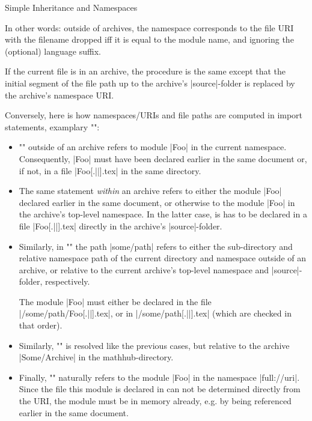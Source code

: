 \begin{sfragment}{Simple Inheritance and Namespaces}
\begin{dangerbox}
   In other words: outside of archives, the namespace corresponds to
   the file URI with the filename dropped iff it is equal to the
   module name, and ignoring the (optional) language suffix.

   If the current file is in an archive, the procedure is the same
   except that the initial segment of the file path up to the archive's
   |source|-folder is replaced by the archive's namespace URI.
\end{dangerbox}

\begin{dangerbox}
        Conversely, here is how namespaces/URIs and file paths are computed
 in import statements, examplary \stexcode"\importmodule":

 \begin{itemize}
   \item \stexcode"" outside of an archive refers 
     to module |Foo| in the current namespace. Consequently, |Foo|
     must have been declared earlier in the same document or, if not,
     in a file |Foo[.||].tex| in the same directory.
   \item The same statement \emph{within} an archive refers to either
     the module |Foo| declared earlier in the same document, or
     otherwise to the module |Foo| in the archive's top-level namespace.
     In the latter case, is has to be declared in a file |Foo[.||].tex|
     directly in the archive's |source|-folder.
   \item Similarly, in \stexcode"" the path
     |some/path| refers to either the sub-directory and relative 
     namespace path of the current directory and namespace outside of an archive,
     or relative to the current archive's top-level namespace and |source|-folder,
     respectively.

     The module |Foo| must either be declared in the file
     |/some/path/Foo[.||].tex|, or in
     |/some/path[.||].tex| (which are
     checked in that order).
   \item Similarly, \stexcode""
     is resolved like the previous cases, but relative to the archive
     |Some/Archive| in the mathhub-directory.
   \item Finally, \stexcode"" naturally refers to the
     module |Foo| in the namespace |full://uri|. Since the file this module
     is declared in can not be determined directly from the URI, the module
     must be in memory already, e.g. by being referenced earlier in the
     same document.


\end{itemize}
\end{dangerbox}
\end{sfragment}
